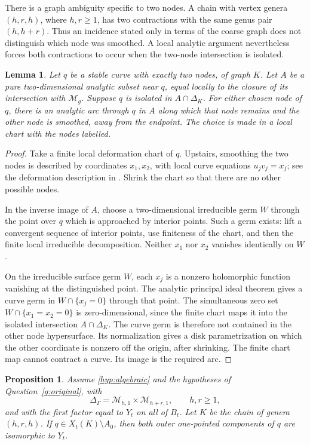 \documentclass[11pt]{article}
\newcommand{\M}{\mathcal M}
\newtheorem{proposition}[theorem]{Proposition}
\newtheorem{lemma}[theorem]{Lemma}
\theoremstyle{definition}
\theoremstyle{remark}
\begin{document}
There is a graph ambiguity specific to two nodes. A chain with vertex genera $(h,r,h)$, where $h,r\geq1$, has two contractions with the same genus pair $(h,h+r)$. Thus an incidence stated only in terms of the coarse graph does not distinguish which node was smoothed. A local analytic argument nevertheless forces both contractions to occur when the two-node intersection is isolated.

\begin{lemma}\label{lem:two-node}
Let $q$ be a stable curve with exactly two nodes, of graph $K$. Let $A$ be a pure two-dimensional analytic subset near $q$, equal locally to the closure of its intersection with $\M_g$. Suppose $q$ is isolated in $A\cap\Delta_K$. For either chosen node of $q$, there is an analytic arc through $q$ in $A$ along which that node remains and the other node is smoothed, away from the endpoint. The choice is made in a local chart with the nodes labelled.
\end{lemma}

\begin{proof}
Take a finite local deformation chart of $q$. Upstairs, smoothing the two nodes is described by coordinates $x_1,x_2$, with local curve equations $u_jv_j=x_j$; see the deformation description in \cite[proof of Proposition~3.7, p.~174]{EF}. Shrink the chart so that there are no other possible nodes.

In the inverse image of $A$, choose a two-dimensional irreducible germ $W$ through the point over $q$ which is approached by interior points. Such a germ exists: lift a convergent sequence of interior points, use finiteness of the chart, and then the finite local irreducible decomposition. Neither $x_1$ nor $x_2$ vanishes identically on $W$.

On the irreducible surface germ $W$, each $x_j$ is a nonzero holomorphic function vanishing at the distinguished point. The analytic principal ideal theorem gives a curve germ in $W\cap\{x_j=0\}$ through that point. The simultaneous zero set $W\cap\{x_1=x_2=0\}$ is zero-dimensional, since the finite chart maps it into the isolated intersection $A\cap\Delta_K$. The curve germ is therefore not contained in the other node hypersurface. Its normalization gives a disk parametrization on which the other coordinate is nonzero off the origin, after shrinking. The finite chart map cannot contract a curve. Its image is the required arc.
\end{proof}

\begin{proposition}\label{prop:outer}
Assume \eqref{hyp:algebraic} and the hypotheses of Question~\ref{q:original}, with
\[
 \Delta_\Gamma=\M_{h,1}\times\M_{h+r,1},\qquad h,r\geq1,
\]
and with the first factor equal to $Y_t$ on all of $B_t$. Let $K$ be the chain of genera $(h,r,h)$. If $q\in X_t(K)\setminus A_0$, then both outer one-pointed components of $q$ are isomorphic to $Y_t$.
\end{proposition}
\end{document}

